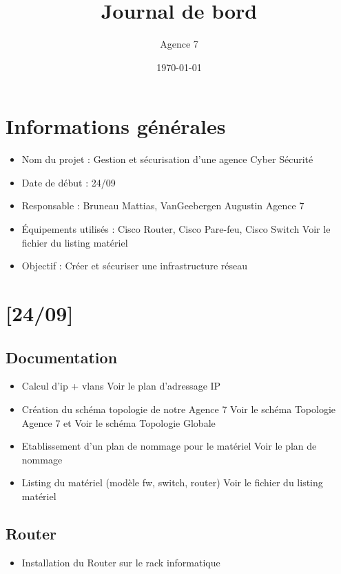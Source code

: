 \documentclass{article}
\title{Journal de bord}
\author{Agence 7}
\date{\today}
\begin{document}
\maketitle

\tableofcontents
\newpage

\section{Informations générales}
\begin{itemize}
\item Nom du projet : Gestion et sécurisation d'une agence Cyber Sécurité
\item Date de début : 24/09
\item Responsable : Bruneau Mattias, VanGeebergen Augustin Agence 7
\item Équipements utilisés : Cisco Router, Cisco Pare-feu, Cisco Switch Voir le fichier du listing matériel
\item Objectif : Créer et sécuriser une infrastructure réseau
\end{itemize}

\newpage


\section{[24/09]}

\subsection{Documentation}
\begin{itemize}
\item Calcul d'ip + vlans Voir le plan d'adressage IP
\item Création du schéma topologie de notre Agence 7 Voir le schéma Topologie Agence 7 et Voir le schéma Topologie Globale
\item Etablissement d'un plan de nommage pour le matériel Voir le plan de nommage
\item Listing du matériel (modèle fw, switch, router) Voir le fichier du listing matériel
\end{itemize}

\subsection{Router}
\begin{itemize}
\item Installation du Router sur le rack informatique
\end{itemize}
\end{document}
